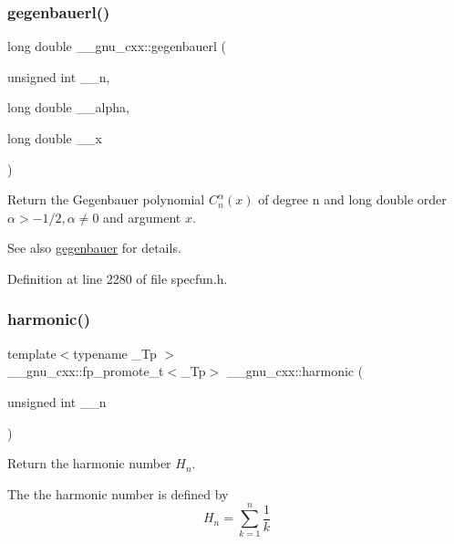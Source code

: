 \subsubsection{\texorpdfstring{gegenbauerl()}{gegenbauerl()}}
{\footnotesize\ttfamily long double \+\_\+\+\_\+gnu\+\_\+cxx\+::gegenbauerl (\begin{DoxyParamCaption}\item[{unsigned int}]{\+\_\+\+\_\+n,  }\item[{long double}]{\+\_\+\+\_\+alpha,  }\item[{long double}]{\+\_\+\+\_\+x }\end{DoxyParamCaption})\hspace{0.3cm}{\ttfamily [inline]}}

Return the Gegenbauer polynomial $ C_n^{\alpha}(x) $ of degree {\ttfamily n} and {\ttfamily long double} order $ \alpha > -1/2, \alpha \neq 0 $ and argument $ x $.

\begin{DoxySeeAlso}{See also}
\hyperlink{group__gnu__math__spec__func_ga173ae710f76407f5997a4caa5c3c060e}{gegenbauer} for details. 
\end{DoxySeeAlso}


Definition at line 2280 of file specfun.\+h.

\mbox{\label{group__gnu__math__spec__func_gab052b72af9c7ec030bcea81965390614}} 
\subsubsection{\texorpdfstring{harmonic()}{harmonic()}}
{\footnotesize\ttfamily template$<$typename \+\_\+\+Tp $>$ \\
\+\_\+\+\_\+gnu\+\_\+cxx\+::fp\+\_\+promote\+\_\+t$<$\+\_\+\+Tp$>$ \+\_\+\+\_\+gnu\+\_\+cxx\+::harmonic (\begin{DoxyParamCaption}\item[{unsigned int}]{\+\_\+\+\_\+n }\end{DoxyParamCaption})\hspace{0.3cm}{\ttfamily [inline]}}

Return the harmonic number $ H_n $.

The the harmonic number is defined by \[ H_n = \sum_{k=1}^{n}\frac{1}{k} \]


